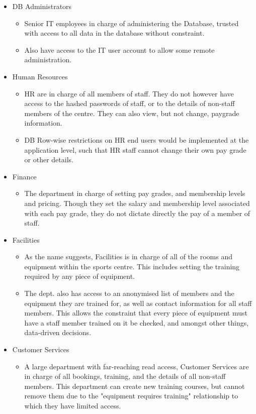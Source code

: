 \documentclass[a4paper, titlepage]{article}
\begin{document}
\begin{itemize}
	\item DB Administrators
	\begin{itemize}
		\item Senior IT employees in charge of administering the Database, trusted with access to all data in the database without constraint.
		\item Also have access to the IT user account to allow some remote administration.
	\end{itemize}
	\item Human Resources
	\begin{itemize}
		\item HR are in charge of all members of staff. They do not however have access to the hashed passwords of staff, or to the details of non-staff members of the centre. They can also view, but not change, paygrade information.
		\item DB Row-wise restrictions on HR end users would be implemented at the application level, such that HR staff cannot change their own pay grade or other details.
	\end{itemize}
	\item Finance
	\begin{itemize}
		\item The department in charge of setting pay grades, and membership levels and pricing. Though they set the salary and membership level associated with each pay grade, they do not dictate directly the pay of a member of staff.
	\end{itemize}
	\item Facilities
	\begin{itemize}
		\item As the name suggests, Facilities is in charge of all of the rooms and equipment within the sports centre. This includes setting the training required by any piece of equipment. 
		\item The dept. also has access to an anonymised list of members and the equipment they are trained for, as well as contact information for all staff members. This allows the constraint that every piece of equipment must have a staff member trained on it be checked, and amongst other things, data-driven decisions.
	\end{itemize}
	\item Customer Services
	\begin{itemize}
		\item A large department with far-reaching read access, Customer Services are in charge of all bookings, training, and the details of all non-staff members. This department can create new training courses, but cannot remove them due to the "equipment requires training" relationship to which they have limited access.

\end{itemize}
\end{itemize}
\end{document}
